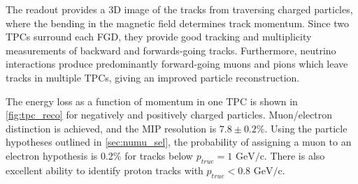 The readout provides a 3D image of the tracks from traversing charged particles, where the bending in the magnetic field determines track momentum. Since two TPCs surround each FGD, they provide good tracking and multiplicity measurements of backward and forwards-going tracks. Furthermore, neutrino interactions produce predominantly forward-going muons and pions which leave tracks in multiple TPCs, giving an improved particle reconstruction.

The energy loss as a function of momentum in one TPC is shown in \autoref{fig:tpc_reco} for negatively and positively charged particles. Muon/electron distinction is achieved, and the MIP resolution is $7.8\pm0.2\%$. Using the particle hypotheses outlined in \autoref{sec:numu_sel}, the probability of assigning a muon to an electron hypothesis is 0.2\% for tracks below $p_{true}=1 \text{ GeV/c}$. There is also excellent ability to identify proton tracks with $p_{true} < 0.8 \text{ GeV/c}$\cite{thesis_tpc}.
